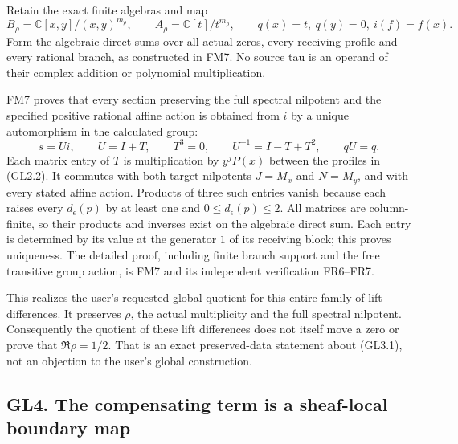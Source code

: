 Retain the exact finite algebras and map \[
B_\rho=\mathbb C[x,y]/(x,y)^{m_\rho},
\qquad A_\rho=\mathbb C[t]/t^{m_\rho},
\qquad q(x)=t,\ q(y)=0,\ i(f)=f(x).
\] Form the algebraic direct sums over all actual zeros, every receiving
profile and every rational branch, as constructed in FM7. No source tau
is an operand of their complex addition or polynomial multiplication.

FM7 proves that every section preserving the full spectral nilpotent and
the specified positive rational affine action is obtained from \(i\) by
a unique automorphism in the calculated group: \[
s=Ui,\qquad U=I+T,\qquad T^3=0,
\qquad U^{-1}=I-T+T^2,
\qquad qU=q.
\tag{GL3.1}
\] Each matrix entry of \(T\) is multiplication by \(y^jP(x)\) between
the profiles in (GL2.2). It commutes with both target nilpotents
\(J=M_x\) and \(N=M_y\), and with every stated affine action. Products
of three such entries vanish because each raises every \(d_\epsilon(p)\)
by at least one and \(0\le d_\epsilon(p)\le2\). All matrices are
column-finite, so their products and inverses exist on the algebraic
direct sum. Each entry is determined by its value at the generator \(1\)
of its receiving block; this proves uniqueness. The detailed proof,
including finite branch support and the free transitive group action, is
FM7 and its independent verification FR6--FR7.

This realizes the user's requested global quotient for this entire
family of lift differences. It preserves \(\rho\), the actual
multiplicity and the full spectral nilpotent. Consequently the quotient
of these lift differences does not itself move a zero or prove that
\(\Re\rho=1/2\). That is an exact preserved-data statement about
(GL3.1), not an objection to the user's global construction.

\subsection{GL4. The compensating term is a sheaf-local boundary
map}\label{gl4.-the-compensating-term-is-a-sheaf-local-boundary-map}

